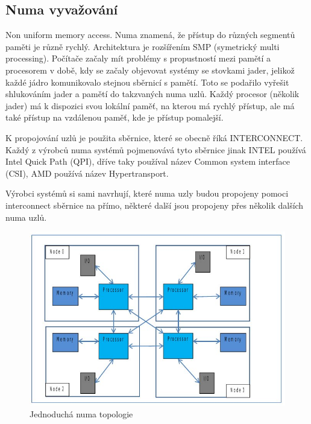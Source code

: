 \documentclass[
  field=ainfk,
  biblatex,
  glossaries,
  index
]{kidiplom}
\begin{document}
\newpage
\subsection{Numa vyvažování}

Non uniform memory access. Numa znamená, že přístup do různých segmentů paměti je různě rychlý. Architektura je rozšířením SMP (symetrický multi processing). Počítače začaly mít problémy s propustností mezi pamětí a procesorem v době, kdy se začaly objevovat systémy se stovkami jader, jelikož každé jádro komunikovalo stejnou sběrnicí s pamětí. Toto se podařilo vyřešit shlukováním jader a pamětí do takzvaných numa uzlů. Každý procesor (několik jader) má k dispozici svou lokální paměť, na kterou má rychlý přístup, ale má také přístup na vzdálenou paměť, kde je přístup pomalejší.

K propojování uzlů je použita sběrnice, které se obecně říká INTERCONNECT. Každý z výrobců numa systémů pojmenovává tyto sběrnice jinak INTEL používá Intel Quick Path (QPI), dříve taky používal název Common system interface (CSI), AMD používá název Hypertransport.

Výrobci systémů si sami navrhují, které numa uzly budou propojeny pomoci interconnect sběrnice na přímo, některé další jsou propojeny přes několik dalších numa uzlů. 


\begin{figure}[ht]
\includegraphics[scale=0.78]{obrazky/numa-scheme.jpeg}
\caption{Jednoduchá numa topologie}
\label{numa scheme1}
\end{figure}
\end{document}
